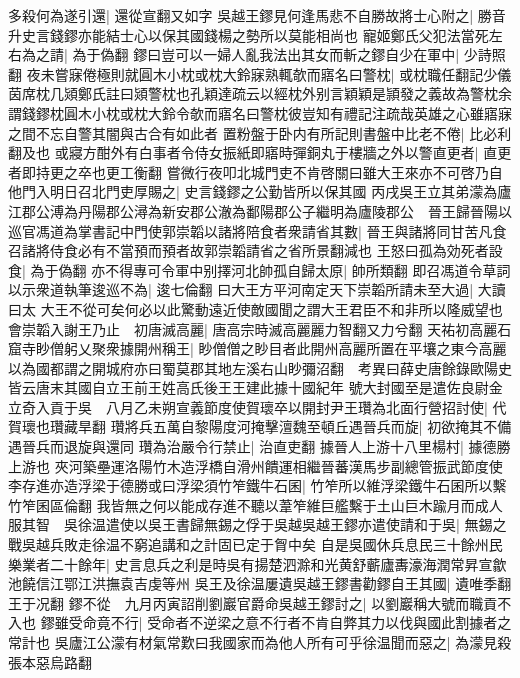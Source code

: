 多殺何為遂引還|{
	還從宣翻又如字}
吳越王鏐見何逢馬悲不自勝故將士心附之|{
	勝音升史言錢鏐亦能結士心以保其國錢楊之勢所以莫能相尚也}
寵姬鄭氏父犯法當死左右為之請|{
	為于偽翻}
鏐曰豈可以一婦人亂我法出其女而斬之鏐自少在軍中|{
	少詩照翻}
夜未嘗寐倦極則就圓木小枕或枕大鈴寐熟輒欹而寤名曰警枕|{
	或枕職任翻記少儀茵席枕几熲鄭氏註曰熲警枕也孔穎達疏云以經枕外别言穎穎是頴發之義故為警枕余謂錢鏐枕圓木小枕或枕大鈴令欹而寤名曰警枕彼豈知有禮記注疏哉英雄之心雖寤寐之間不忘自警其闇與古合有如此者}
置粉盤于卧内有所記則書盤中比老不倦|{
	比必利翻及也}
或寢方酣外有白事者令侍女振紙即寤時彈銅丸于樓牆之外以警直更者|{
	直更者即持更之卒也更工衡翻}
嘗微行夜叩北城門吏不肯啓關曰雖大王來亦不可啓乃自他門入明日召北門吏厚賜之|{
	史言錢鏐之公勤皆所以保其國}
丙戌吳王立其弟濛為廬江郡公溥為丹陽郡公潯為新安郡公澈為鄱陽郡公子繼明為廬陵郡公　晉王歸晉陽以巡官馮道為掌書記中門使郭崇韜以諸將陪食者衆請省其數|{
	晉王與諸將同甘苦凡食召諸將侍食必有不當預而預者故郭崇韜請省之省所景翻減也}
王怒曰孤為効死者設食|{
	為于偽翻}
亦不得專可令軍中别擇河北帥孤自歸太原|{
	帥所類翻}
即召馮道令草詞以示衆道執筆逡巡不為|{
	逡七倫翻}
曰大王方平河南定天下崇韜所請未至大過|{
	大讀曰太}
大王不從可矣何必以此驚動遠近使敵國聞之謂大王君臣不和非所以隆威望也會崇韜入謝王乃止　初唐滅高麗|{
	唐高宗時滅高麗麗力智翻又力兮翻}
天祐初高麗石窟寺眇僧躬乂聚衆據開州稱王|{
	眇僧僧之眇目者此開州高麗所置在平壤之東今高麗以為國都謂之開城府亦曰蜀莫郡其地左溪右山眇彌沼翻　考異曰薛史唐餘錄歐陽史皆云唐末其國自立王前王姓高氏後王王建此據十國紀年}
號大封國至是遣佐良尉金立奇入貢于吳　八月乙未朔宣義節度使賀瓌卒以開封尹王瓚為北面行營招討使|{
	代賀瓌也瓚藏旱翻}
瓚將兵五萬自黎陽度河掩擊澶魏至頓丘遇晉兵而旋|{
	初欲掩其不備遇晉兵而退旋與還同}
瓚為治嚴令行禁止|{
	治直吏翻}
據晉人上游十八里楊村|{
	據德勝上游也}
夾河築壘運洛陽竹木造浮橋自滑州饋運相繼晉蕃漢馬步副總管振武節度使李存進亦造浮梁于德勝或曰浮梁須竹笮鐵牛石囷|{
	竹笮所以維浮梁鐵牛石囷所以繫竹笮囷區倫翻}
我皆無之何以能成存進不聽以葦笮維巨艦繫于土山巨木踰月而成人服其智　吳徐温遣使以吳王書歸無錫之俘于吳越吳越王鏐亦遣使請和于吳|{
	無錫之戰吳越兵敗走徐温不窮追講和之計固已定于胷中矣}
自是吳國休兵息民三十餘州民樂業者二十餘年|{
	史言息兵之利是時吳有揚楚泗滁和光黄舒蘄廬夀濠海潤常昇宣歙池饒信江鄂江洪撫袁吉虔等州}
吳王及徐温屢遺吳越王鏐書勸鏐自王其國|{
	遺唯季翻王于况翻}
鏐不從　九月丙寅詔削劉巖官爵命吳越王鏐討之|{
	以劉巖稱大號而職貢不入也}
鏐雖受命竟不行|{
	受命者不逆梁之意不行者不肯自弊其力以伐與國此割據者之常計也}
吳廬江公濛有材氣常歎曰我國家而為他人所有可乎徐温聞而惡之|{
	為濛見殺張本惡烏路翻}


